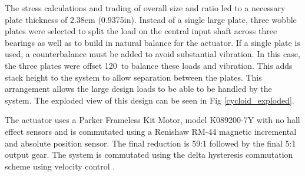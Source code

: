 The stress calculations and trading of overall size and ratio led to a necessary plate thickness of 2.38cm (0.9375in). Instead of a single large plate, three wobble plates were selected to split the load on the central input shaft across three bearings as well as to build in natural balance for the actuator. If a single plate is used, a counterbalance must be added to avoid substantial vibration. In this case, the three plates were offset 120\textdegree\ to balance these loads and vibration. This adds stack height to the system to allow separation between the plates. This arrangement allows the large design loads to be able to be handled by the system. The exploded view of this design can be seen in Fig \ref{cycloid_exploded}. 

The actuator uses a Parker Frameless Kit Motor, model K089200-7Y with no hall effect sensors and is commutated using a Renishaw RM-44 magnetic incremental and absolute position sensor. The final reduction is 59:1 followed by the final 5:1 output gear. The system is commutated using the delta hysteresis commutation scheme using velocity control \cite{electric_machines}. 
